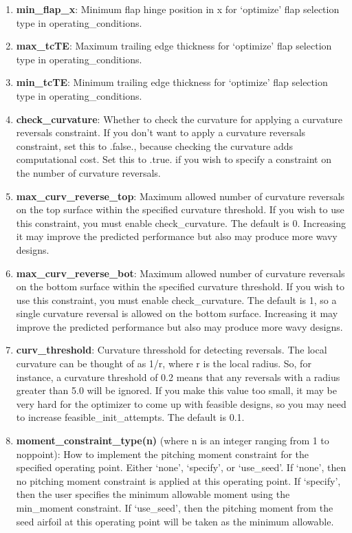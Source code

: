 \documentclass[11pt]{article}
\begin{document}
\begin{enumerate}
\item{\textbf{min\_flap\_x}: Minimum flap hinge position in x for `optimize' flap 
	selection type in operating\_conditions.}

\item{\textbf{max\_tcTE}: Maximum trailing edge thickness for `optimize' flap 
	selection type in operating\_conditions.}

\item{\textbf{min\_tcTE}: Minimum trailing edge thickness for `optimize' flap 
	selection type in operating\_conditions.}

\item{\textbf{check\_curvature}: Whether to check the curvature for applying a curvature
reversals constraint.  If you don't want to apply a curvature reversals constraint, set
this to .false., because checking the curvature adds computational cost.  Set this to
.true. if you wish to specify a constraint on the number of curvature reversals.}

\item{\textbf{max\_curv\_reverse\_top}: Maximum allowed number of curvature reversals on
the top surface within the specified curvature threshold.  If you wish to use this 
constraint, you must enable check\_curvature. The default is 0. Increasing it may improve
the predicted performance but also may produce more wavy designs.}

\item{\textbf{max\_curv\_reverse\_bot}: Maximum allowed number of curvature reversals on
the bottom surface within the specified curvature threshold.  If you wish to use this 
constraint, you must enable check\_curvature. The default is 1, so a single curvature
reversal is allowed on the bottom surface.  Increasing it may improve the predicted
performance but also may produce more wavy designs.}

\item{\textbf{curv\_threshold}: Curvature thresshold for detecting reversals.  The local
curvature can be thought of as 1/r, where r is the local radius.  So, for instance, a
curvature threshold of 0.2 means that any reversals with a radius greater than 5.0 will
be ignored.  If you make this value too small, it may be very hard for the optimizer to
come up with feasible designs, so you may need to increase feasible\_init\_attempts. The
default is 0.1.} 


\item{\textbf{moment\_constraint\_type(n)} (where n is an integer ranging from 1 to
	noppoint): How to implement the pitching moment constraint for the specified operating
	point. Either `none', `specify', or `use\_seed'.  If `none', then no pitching moment 
	constraint is applied at this operating point.  If `specify', then the user specifies the 
	minimum allowable moment using the min\_moment constraint.  If `use\_seed', then the 
	pitching moment from the seed airfoil at this operating point will be taken as the minimum
	allowable.}


\end{enumerate}
\end{document}
